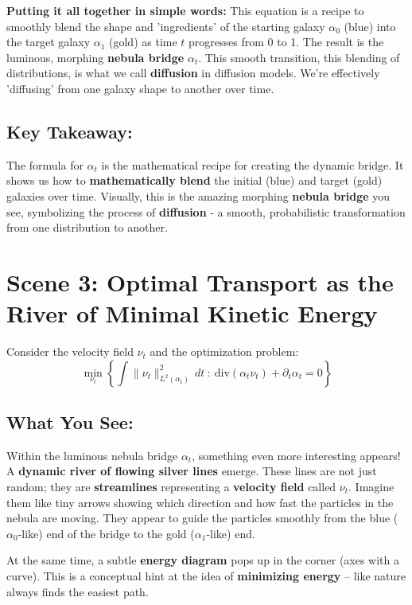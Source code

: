 \documentclass{article}
\begin{document}
\textbf{Putting it all together in simple words:}  This equation is a recipe to smoothly blend the shape and 'ingredients' of the starting galaxy \( \alpha_0 \) (blue) into the target galaxy \( \alpha_1 \) (gold) as time \( t \) progresses from 0 to 1.  The result is the luminous, morphing \textbf{nebula bridge} \( \alpha_t \).  This smooth transition, this blending of distributions, is what we call \textbf{diffusion} in diffusion models. We're effectively 'diffusing' from one galaxy shape to another over time.

\subsection*{Key Takeaway:}

The formula for \( \alpha_t \) is the mathematical recipe for creating the dynamic bridge. It shows us how to \textbf{mathematically blend} the initial (blue) and target (gold) galaxies over time.  Visually, this is the amazing morphing \textbf{nebula bridge} you see, symbolizing the process of \textbf{diffusion} - a smooth, probabilistic transformation from one distribution to another.

\hrulefill

\section*{Scene 3: Optimal Transport as the River of Minimal Kinetic Energy}

\noindent Consider the velocity field \( \nu_t \) and the optimization problem:
\[
\min_{\nu_t} \left\{ \int \|\nu_t\|_{L^2(\alpha_t)}^2 \, dt \ : \ \text{div}(\alpha_t \nu_t) + \partial_t \alpha_t = 0 \right\}
\]

\subsection*{What You See:}

Within the luminous nebula bridge \( \alpha_t \), something even more interesting appears!  A \textbf{dynamic river of flowing silver lines} emerge. These lines are not just random; they are \textbf{streamlines} representing a \textbf{velocity field} called \( \nu_t \). Imagine them like tiny arrows showing which direction and how fast the particles in the nebula are moving.  They appear to guide the particles smoothly from the blue (\( \alpha_0 \)-like) end of the bridge to the gold (\( \alpha_1 \)-like) end.

At the same time, a subtle \textbf{energy diagram} pops up in the corner (axes with a curve). This is a conceptual hint at the idea of \textbf{minimizing energy} – like nature always finds the easiest path.
\end{document}
